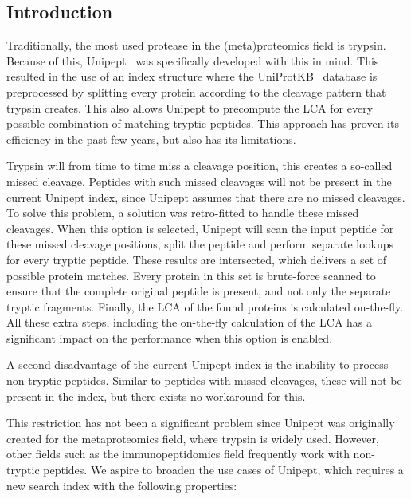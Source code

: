 \documentclass[11pt]{article}
\begin{document}
    \begin{multicols}{2}
        \section{Introduction}\label{sec:introduction}
        Traditionally, the most used protease in the (meta)proteomics field is trypsin.
        Because of this, Unipept~\cite{unipept_desktop, unipept_api, unipept_4, unipept_orig, unipept_tutorial, unipept_web, unipept_cli, unipept_desktop_2} was specifically developed with this in mind.
        This resulted in the use of an index structure where the UniProtKB~\cite{UniprotKB} database is preprocessed by splitting every protein according to the cleavage pattern that trypsin creates.
        This also allows Unipept to precompute the LCA for every possible combination of matching tryptic peptides.
        This approach has proven its efficiency in the past few years, but also has its limitations.

        Trypsin will from time to time miss a cleavage position, this creates a so-called missed cleavage.
        Peptides with such missed cleavages will not be present in the current Unipept index, since Unipept assumes that there are no missed cleavages.
        To solve this problem, a solution was retro-fitted to handle these missed cleavages.
        When this option is selected, Unipept will scan the input peptide for these missed cleavage positions, split the peptide and perform separate lookups for every tryptic peptide.
        These results are intersected, which delivers a set of possible protein matches.
         Every protein in this set is brute-force scanned to ensure that the complete original peptide is present, and not only the separate tryptic fragments.
        Finally, the LCA of the found proteins is calculated on-the-fly.
        All these extra steps, including the on-the-fly calculation of the LCA has a significant impact on the performance when this option is enabled.

        A second disadvantage of the current Unipept index is the inability to process non-tryptic peptides.
        Similar to peptides with missed cleavages, these will not be present in the index, but there exists no workaround for this.

        This restriction has not been a significant problem since Unipept was originally created for the metaproteomics field, where trypsin is widely used.
        However, other fields such as the immunopeptidomics field frequently work with non-tryptic peptides.
        We aspire to broaden the use cases of Unipept, which requires a new search index with the following properties:


\end{multicols}
\end{document}
